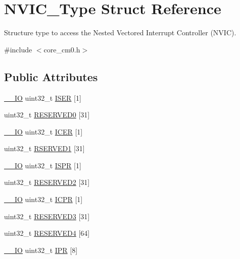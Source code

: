 \hypertarget{struct_n_v_i_c___type}{}\section{N\+V\+I\+C\+\_\+\+Type Struct Reference}
\label{struct_n_v_i_c___type}


Structure type to access the Nested Vectored Interrupt Controller (N\+V\+IC).  




{\ttfamily \#include $<$core\+\_\+cm0.\+h$>$}

\subsection*{Public Attributes}
\begin{DoxyCompactItemize}
\item 
\hyperlink{group___c_m_s_i_s__core__definitions_gaec43007d9998a0a0e01faede4133d6be}{\+\_\+\+\_\+\+IO} uint32\+\_\+t \hyperlink{struct_n_v_i_c___type_a1f17e124416ac253386a3e3a339adebf}{I\+S\+ER} \mbox{[}1\mbox{]}
\item 
uint32\+\_\+t \hyperlink{struct_n_v_i_c___type_a52b6b330b9662b8e8962afd2bc22eab2}{R\+E\+S\+E\+R\+V\+E\+D0} \mbox{[}31\mbox{]}
\item 
\hyperlink{group___c_m_s_i_s__core__definitions_gaec43007d9998a0a0e01faede4133d6be}{\+\_\+\+\_\+\+IO} uint32\+\_\+t \hyperlink{struct_n_v_i_c___type_a1d18c89c94cf0f7ece8db0d5351aced9}{I\+C\+ER} \mbox{[}1\mbox{]}
\item 
uint32\+\_\+t \hyperlink{struct_n_v_i_c___type_a97b6f852da06799a309457b83d4801d9}{R\+S\+E\+R\+V\+E\+D1} \mbox{[}31\mbox{]}
\item 
\hyperlink{group___c_m_s_i_s__core__definitions_gaec43007d9998a0a0e01faede4133d6be}{\+\_\+\+\_\+\+IO} uint32\+\_\+t \hyperlink{struct_n_v_i_c___type_ae6195c2f637c22c97d01ca5c71305bc3}{I\+S\+PR} \mbox{[}1\mbox{]}
\item 
uint32\+\_\+t \hyperlink{struct_n_v_i_c___type_ad65f1d8ada494ac3e4a01b5d8fc0e4af}{R\+E\+S\+E\+R\+V\+E\+D2} \mbox{[}31\mbox{]}
\item 
\hyperlink{group___c_m_s_i_s__core__definitions_gaec43007d9998a0a0e01faede4133d6be}{\+\_\+\+\_\+\+IO} uint32\+\_\+t \hyperlink{struct_n_v_i_c___type_a0dccb8954db63a673212815f56031625}{I\+C\+PR} \mbox{[}1\mbox{]}
\item 
uint32\+\_\+t \hyperlink{struct_n_v_i_c___type_a9416f445547a08e24c3fdda87abb0fa6}{R\+E\+S\+E\+R\+V\+E\+D3} \mbox{[}31\mbox{]}
\item 
uint32\+\_\+t \hyperlink{struct_n_v_i_c___type_a86c49460af6ebd251da0b08a0e9049f7}{R\+E\+S\+E\+R\+V\+E\+D4} \mbox{[}64\mbox{]}
\item 
\hyperlink{group___c_m_s_i_s__core__definitions_gaec43007d9998a0a0e01faede4133d6be}{\+\_\+\+\_\+\+IO} uint32\+\_\+t \hyperlink{struct_n_v_i_c___type_a2e29b486ab9ebee3eba25091aff18ec6}{I\+PR} \mbox{[}8\mbox{]}
\end{DoxyCompactItemize}


